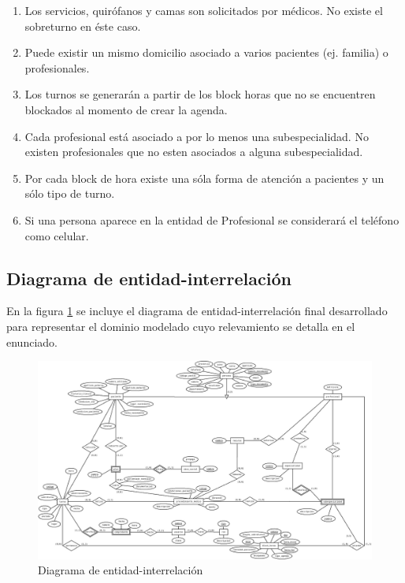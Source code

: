 \documentclass[a4paper,11pt]{article}
\begin{document}
\begin{enumerate}
    \item Los servicios, quirófanos y camas son solicitados por médicos. No existe 
    el sobreturno en éste caso.
    
    \item Puede existir un mismo domicilio asociado a varios pacientes (ej. familia)
    o profesionales.
    
    \item Los turnos se generarán a partir de los block horas que no se encuentren 
    blockados al momento de crear la agenda.
    
    \item Cada profesional está asociado a por lo menos una subespecialidad. No existen 
    profesionales que no esten asociados a alguna subespecialidad.
    
    \item Por cada block de hora existe una sóla forma de atención a pacientes y un 
    sólo tipo de turno.

    \item Si una persona aparece en la entidad de Profesional se considerará el teléfono
    como celular.

\end{enumerate}



\subsection{Diagrama de entidad-interrelación}

 En la figura \ref{fig:der} se incluye el diagrama de entidad-interrelación
 final desarrollado para representar el dominio modelado cuyo relevamiento se
 detalla en el enunciado.

\begin{figure}[h!t]
  \centering
  \includegraphics[width=1.4\textwidth, angle=90]{build/images/der.jpeg}
  \caption{Diagrama de entidad-interrelación} \label{fig:der}
\end{figure}
\end{document}

